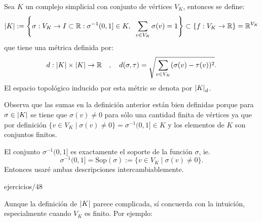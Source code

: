 \documentclass[../../topologia_algebraica]{subfiles}
\begin{document}
\begin{defin}
  Sea $K$ un complejo simplicial con conjunto de v\'ertices $V_K$, entonces se define:
  \[
    \left| K \right|:=
    \left\{\sigma:V_K\rightarrow I\subset\mathbb{R} : \sigma^{-1}(0,1]\in K,\;\;\sum_{v\in V_K}\sigma(v)=1\right\}\subset
    \{f:V_K\rightarrow\mathbb{R}\}=\mathbb{R}^{V_K}
  \]
  que tiene una m\'etrica definida por:
  \[
    d:\left| K \right|\times\left| K \right| \rightarrow \mathbb{R} \quad,\quad d(\sigma,\tau)=\sqrt{\sum_{v\in V_K}(\sigma(v)-\tau(v))^2}.
  \]
  El espacio topol\'ogico inducido por esta m\'etric se denota por $\left| K \right|_d$.
\end{defin}

Observa que las sumas en la definici\'on anterior est\'an bien definidas porque para $\sigma\in\left| K \right|$
se tiene que $\sigma(v)\neq 0$ para s\'olo una cantidad finita de v\'ertices ya que por definici\'on
$\{v\in V_K\mid \sigma(v)\neq 0\}=\sigma^{-1}(0,1]\in K$ y los elementos de $K$ son conjuntos finitos.

\begin{nota}
  El conjunto $\sigma^{-1}(0,1]$ es exactamente el soporte de la funci\'on $\sigma$, ie.
  \[
    \sigma^{-1}(0,1]=\text{Sop}(\sigma):=\{v\in V_K\mid \sigma(v)\neq 0\}.
  \]
  Entonces usar\'e ambas descripciones intercambiablemente.
\end{nota}

{ejercicios/48} %

Aunque la definici\'on de $\left| K \right|$ parece complicada, s\'i concuerda con la intuici\'on,
especialmente cuando $V_K$ es finito. Por ejemplo:
\end{document}
